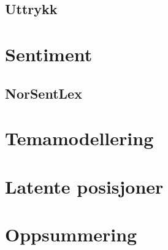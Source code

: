 \documentclass[
]{book}
\begin{document}
\hypertarget{uttrykk}{%
\section{Uttrykk}\label{uttrykk}}

\hypertarget{sentiment}{%
\chapter{Sentiment}\label{sentiment}}

\hypertarget{norsentlex}{%
\section{NorSentLex}\label{norsentlex}}

\hypertarget{topicmod}{%
\chapter{Temamodellering}\label{topicmod}}

\hypertarget{posisjon}{%
\chapter{Latente posisjoner}\label{posisjon}}

\hypertarget{oppsummering}{%
\chapter{Oppsummering}\label{oppsummering}}

  
\end{document}

